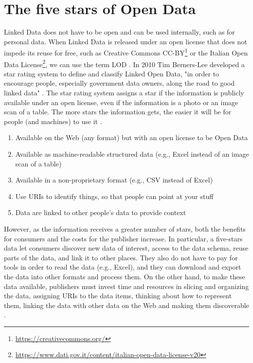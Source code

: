 \section{The five stars of Open Data}
\label{sec:lod-stars}

\newcommand{\Stars}[1]{\clone{#1}{\textcolor{StarColor}{\Large$\bigstar$}}}

Linked Data does not have to be open and can be used internally, such as for personal data. When Linked Data is released under an open license that does not impede its reuse for free, such as Creative Commons CC-BY\footnote{\url{https://creativecommons.org/}} or the Italian Open Data License\footnote{\url{https://www.dati.gov.it/content/italian-open-data-license-v20}}, we can use the term \ac{LOD} \cite{berners2006linked}. In 2010 Tim Berners-Lee developed a star rating system to define and classify Linked Open Data, "in order to encourage people, especially government data owners, along the road to good linked data" \cite{berners2006linked}. The star rating system assigns a star if the information is publicly available under an open license, even if the information is a photo or an image scan of a table. The more stars the information gets, the easier it will be for people (and machines) to use it \cite{berners2006linked}.

\begin{enumerate}[%
align=right,
leftmargin=*,
labelindent=\widthof{\Stars{5}}
]
    \item[\Stars{1}] Available on the Web (any format) but with an open license to be Open Data
    \item[\Stars{2}] Available as machine-readable structured data (e.g., Excel instead of an image scan of a table)
    \item[\Stars{3}] Available in a non-proprietary format (e.g., \acs{CSV} instead of Excel)
    \item[\Stars{4}] Use \acp{URI} to identify things, so that people can point at your stuff
    \item[\Stars{5}] Data are linked to other people's data to provide context
\end{enumerate}

However, as the information receives a greater number of stars, both the benefits for consumers and the costs for the publisher increase. In particular, a five-stars data let consumers discover new data of interest, access to the data schema, reuse parts of the data, and link it to other places. They also do not have to pay for tools in order to read the data (e.g., Excel), and they can download and export the data into other formats and process them. On the other hand, to make these data available, publishers must invest time and resources in slicing and organizing the data, assigning \acp{URI} to the data items, thinking about how to represent them, linking the data with other data on the Web and making them discoverable \cite{bauer2011linked}.